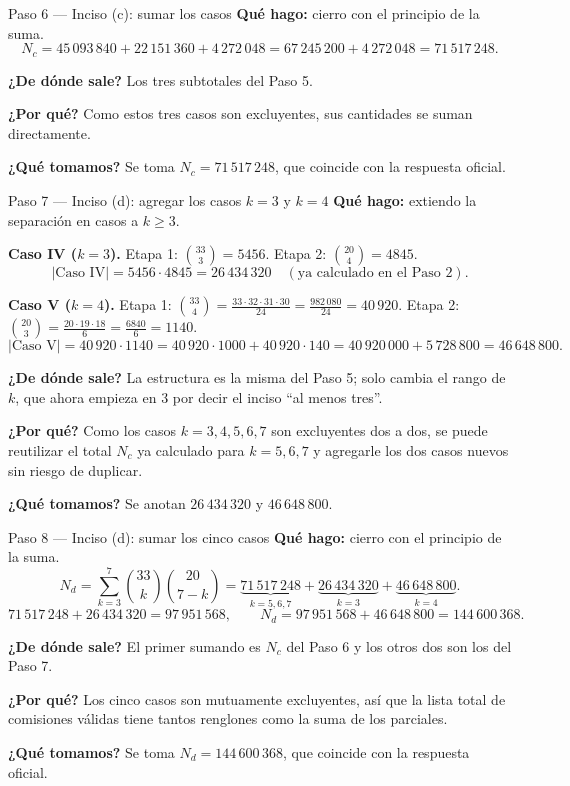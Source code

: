 \documentclass[11pt]{article}
\begin{document}
\begin{paso}{Paso 6 --- Inciso (c): sumar los casos}
\textbf{Qué hago:} cierro con el principio de la suma.
\[
  N_c = 45\,093\,840 + 22\,151\,360 + 4\,272\,048 = 67\,245\,200 + 4\,272\,048 = 71\,517\,248 .
\]

\textbf{¿De dónde sale?} Los tres subtotales del Paso 5.

\textbf{¿Por qué?} Como estos tres casos son excluyentes, sus cantidades se suman directamente.

\textbf{¿Qué tomamos?} Se toma $N_c = 71\,517\,248$, que coincide con la respuesta oficial.
\end{paso}

\begin{paso}{Paso 7 --- Inciso (d): agregar los casos $k=3$ y $k=4$}
\textbf{Qué hago:} extiendo la separación en casos a $k\ge 3$.

\medskip
\textbf{Caso IV ($k=3$).} Etapa 1: $\binom{33}{3}=5456$. Etapa 2: $\binom{20}{4}=4845$.
\[
  |\text{Caso IV}| = 5456\cdot 4845 = 26\,434\,320 \quad(\text{ya calculado en el Paso 2}) .
\]

\textbf{Caso V ($k=4$).} Etapa 1: $\binom{33}{4}=\frac{33\cdot 32\cdot 31\cdot 30}{24}=\frac{982\,080}{24}=40\,920$. Etapa 2: $\binom{20}{3}=\frac{20\cdot 19\cdot 18}{6}=\frac{6840}{6}=1140$.
\[
  |\text{Caso V}| = 40\,920\cdot 1140 = 40\,920\cdot 1000 + 40\,920\cdot 140 = 40\,920\,000 + 5\,728\,800 = 46\,648\,800 .
\]

\textbf{¿De dónde sale?} La estructura es la misma del Paso 5; solo cambia el rango de $k$, que ahora empieza en $3$ por decir el inciso ``al menos tres''.

\textbf{¿Por qué?} Como los casos $k=3,4,5,6,7$ son excluyentes dos a dos, se puede reutilizar el total $N_c$ ya calculado para $k=5,6,7$ y agregarle los dos casos nuevos sin riesgo de duplicar.

\textbf{¿Qué tomamos?} Se anotan $26\,434\,320$ y $46\,648\,800$.
\end{paso}

\begin{paso}{Paso 8 --- Inciso (d): sumar los cinco casos}
\textbf{Qué hago:} cierro con el principio de la suma.
\[
  N_d = \sum_{k=3}^{7} \binom{33}{k}\binom{20}{7-k} = \underbrace{71\,517\,248}_{k=5,6,7} + \underbrace{26\,434\,320}_{k=3} + \underbrace{46\,648\,800}_{k=4} .
\]
\[
  71\,517\,248 + 26\,434\,320 = 97\,951\,568 ,\qquad
  N_d = 97\,951\,568 + 46\,648\,800 = 144\,600\,368 .
\]

\textbf{¿De dónde sale?} El primer sumando es $N_c$ del Paso 6 y los otros dos son los del Paso 7.

\textbf{¿Por qué?} Los cinco casos son mutuamente excluyentes, así que la lista total de comisiones válidas tiene tantos renglones como la suma de los parciales.

\textbf{¿Qué tomamos?} Se toma $N_d = 144\,600\,368$, que coincide con la respuesta oficial.
\end{paso}
\end{document}
